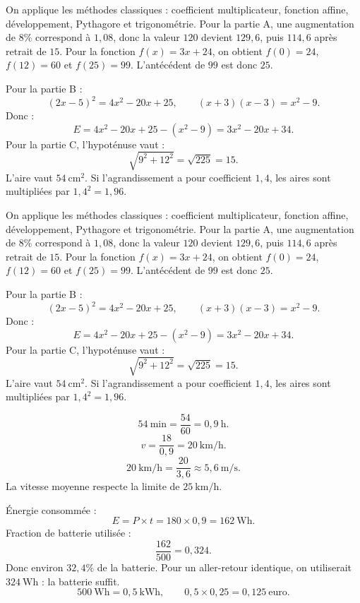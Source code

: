 \documentclass[11pt,a4paper]{article}
\newcounter{correction}
\begin{document}
\begin{correction}
On applique les méthodes classiques : coefficient multiplicateur, fonction affine, développement, Pythagore et trigonométrie. Pour la partie A, une augmentation de $8\%$ correspond à $1{,}08$, donc la valeur $120$ devient $129{,}6$, puis $114{,}6$ après retrait de $15$. Pour la fonction $f(x)=3x+24$, on obtient $f(0)=24$, $f(12)=60$ et $f(25)=99$. L'antécédent de $99$ est donc $25$.

Pour la partie B :
\[
(2x-5)^2=4x^2-20x+25,
\qquad
(x+3)(x-3)=x^2-9.
\]
Donc :
\[
E=4x^2-20x+25-(x^2-9)=3x^2-20x+34.
\]
Pour la partie C, l'hypoténuse vaut :
\[
\sqrt{9^2+12^2}=\sqrt{225}=15.
\]
L'aire vaut $54\ \mathrm{cm^2}$. Si l'agrandissement a pour coefficient $1{,}4$, les aires sont multipliées par $1{,}4^2=1{,}96$.
\end{correction}
\begin{correction}
On applique les méthodes classiques : coefficient multiplicateur, fonction affine, développement, Pythagore et trigonométrie. Pour la partie A, une augmentation de $8\%$ correspond à $1{,}08$, donc la valeur $120$ devient $129{,}6$, puis $114{,}6$ après retrait de $15$. Pour la fonction $f(x)=3x+24$, on obtient $f(0)=24$, $f(12)=60$ et $f(25)=99$. L'antécédent de $99$ est donc $25$.

Pour la partie B :
\[
(2x-5)^2=4x^2-20x+25,
\qquad
(x+3)(x-3)=x^2-9.
\]
Donc :
\[
E=4x^2-20x+25-(x^2-9)=3x^2-20x+34.
\]
Pour la partie C, l'hypoténuse vaut :
\[
\sqrt{9^2+12^2}=\sqrt{225}=15.
\]
L'aire vaut $54\ \mathrm{cm^2}$. Si l'agrandissement a pour coefficient $1{,}4$, les aires sont multipliées par $1{,}4^2=1{,}96$.
\end{correction}
\begin{correction}[PC-LONG-01]
\[
54\ \mathrm{min}=\frac{54}{60}=0{,}9\ \mathrm{h}.
\]
\[
v=\frac{18}{0{,}9}=20\ \mathrm{km/h}.
\]
\[
20\ \mathrm{km/h}=\frac{20}{3{,}6}\approx5{,}6\ \mathrm{m/s}.
\]
La vitesse moyenne respecte la limite de $25\ \mathrm{km/h}$.

Énergie consommée :
\[
E=P\times t=180\times0{,}9=162\ \mathrm{Wh}.
\]
Fraction de batterie utilisée :
\[
\frac{162}{500}=0{,}324.
\]
Donc environ $32{,}4\%$ de la batterie. Pour un aller-retour identique, on utiliserait $324\ \mathrm{Wh}$ : la batterie suffit.
\[
500\ \mathrm{Wh}=0{,}5\ \mathrm{kWh},
\qquad
0{,}5\times0{,}25=0{,}125\ \text{euro}.
\]
\end{correction}
\end{document}

